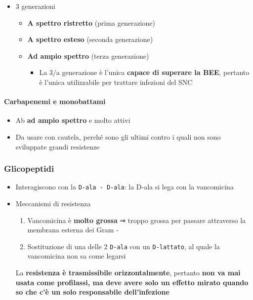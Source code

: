 \documentclass[italian,]{article}
\providecommand{\tightlist}{%
  \setlength{\itemsep}{0pt}\setlength{\parskip}{0pt}}
\begin{document}
\begin{itemize}
\tightlist
\item
  3 generazioni

  \begin{itemize}
  \tightlist
  \item
    \textbf{A spettro ristretto} (prima generazione)
  \item
    \textbf{A spettro esteso} (seconda generazione)
  \item
    \textbf{Ad ampio spettro} (terza generazione)

    \begin{itemize}
    \tightlist
    \item
      La 3/a generazione è l'unica \textbf{capace di superare la BEE},
      pertanto è l'unica utilizzabile per trattare infezioni del SNC
    \end{itemize}
  \end{itemize}
\end{itemize}

\hypertarget{carbapenemi-e-monobattami}{%
\paragraph{Carbapenemi e monobattami}\label{carbapenemi-e-monobattami}}

\begin{itemize}
\tightlist
\item
  Ab \textbf{ad ampio spettro} e molto attivi
\item
  Da usare con cautela, perché sono gli ultimi contro i quali non sono
  sviluppate grandi resistenze
\end{itemize}

\hypertarget{glicopeptidi}{%
\subsubsection{Glicopeptidi}\label{glicopeptidi}}

\begin{itemize}
\tightlist
\item
  Interagiscono con la \texttt{D-ala\ -\ D-ala}: la D-ala si lega con la
  vancomicina
\item
  Meccanismi di resistenza

  \begin{enumerate}
  \def\labelenumi{\arabic{enumi}.}
  \tightlist
  \item
    Vancomicina è \textbf{molto grossa} ⇒ troppo grossa per passare
    attraverso la membrana esterna dei Gram -
  \item
    Sostituzione di una delle 2 \texttt{D-ala} con un
    \texttt{D-lattato}, al quale la vancomicina non sa come legarsi
  \end{enumerate}

  La \textbf{resistenza è trasmissibile orizzontalmente}, pertanto
  \textbf{non va mai usata come profilassi, ma deve avere solo un
  effetto mirato quando so che c'è un solo responsabile dell'infezione}
\end{itemize}
\end{document}
